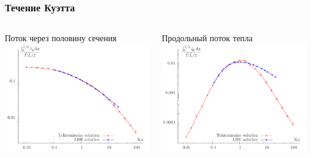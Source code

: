 \documentclass[ucs]{beamer}
\begin{document}
\begin{frame}
	\frametitle{Течение Куэтта}
	\begin{columns}
		\begin{center}
			Поток через половину сечения\\
			\includegraphics[width=\textwidth]{pics/couette_flow}
		\end{center}
		\begin{center}
			Продольный поток тепла\\
			\includegraphics[width=\textwidth]{pics/couette_qflow}
		\end{center}
	\end{columns}
\end{frame}
\end{document}

